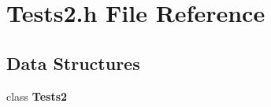 \section{Tests2.\+h File Reference}
\label{Tests2_8h}
\subsection*{Data Structures}
\begin{DoxyCompactItemize}
\item 
class \textbf{ Tests2}
\end{DoxyCompactItemize}
